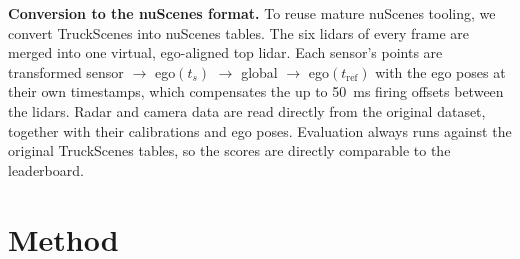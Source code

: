 \documentclass[conference]{IEEEtran}
\begin{document}
\textbf{Conversion to the nuScenes format.} To reuse mature nuScenes tooling, we convert TruckScenes into nuScenes
tables. The six lidars of every frame are merged into one virtual, ego-aligned top lidar. Each sensor's points are
transformed sensor $\rightarrow$ ego$(t_s)$ $\rightarrow$ global $\rightarrow$ ego$(t_\mathrm{ref})$ with the ego
poses at their own timestamps, which compensates the up to 50~ms firing offsets between the lidars. Radar and camera
data are read directly from the original dataset, together with their calibrations and ego poses. Evaluation always
runs against the original TruckScenes tables, so the scores are directly comparable to the leaderboard.

\section{Method}
\end{document}
